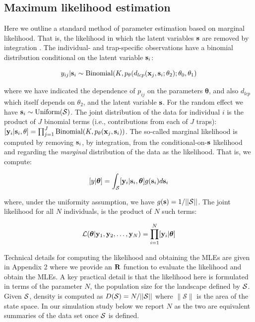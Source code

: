 \documentclass[12pt]{article}
\begin{document}
\begin{spacing}{1.8}
\section{Maximum likelihood estimation}
\label{sec.mle}

Here we outline a standard method of parameter estimation based on
marginal likelihood. That is, the likelihood in which the latent
variables ${\bf s}$ are removed by integration \citep{borchers_efford:2008}.
The individual- and trap-specific observations have a binomial
distribution conditional on the latent variable ${\bf s}_{i}$:

\begin{equation}
  y_{ij}| {\bf s}_{i} \sim \mbox{Binomial}(K, p_{\theta}(d_{lcp}({\bf x}_{j},{\bf s}_{i};\theta_{2}); \theta_{0}, \theta_{1})
\label{mle.eq.cond-on-s}
\end{equation}

{\flushleft where} we have indicated the dependence of $p_{ij}$ on the parameters
${\bm \theta}$, and also $d_{lcp}$ which
itself depends on $\theta_{2}$, and the latent variable ${\bf s}$.
For the random effect we have ${\bf s}_{i} \sim  \mbox{Uniform}({\cal
  S})$.
The joint distribution of the data for individual $i$ is the product
of $J$ binomial terms (i.e., contributions from each of $J$ traps):
$  [{\bf y}_{i} | {\bf s}_{i} , \theta] =
  \prod_{j=1}^{J} \mbox{Binomial}(K, p_{\theta}({\bf x}_{j},{\bf s}_{i}) )$.
 The so-called marginal likelihood is computed by removing
${\bf s}_{i}$, by integration,  from the conditional-on-${\bf s}$
likelihood and regarding the {\it marginal} distribution of the data
as the likelihood. That
is, we compute:

\[
  [y|{\bm \theta}] =
\int_{{\cal S}}  [ {\bf y}_{i} |{\bf s}_{i},{\bm \theta}] g({\bf s}_{i}) d{\bf s}_{i}
\]

{\flushleft where}, under the uniformity assumption, we have
$g({\bf s}) = 1/||{\cal S}||$.
The joint likelihood for all $N$ individuals,
is the product of $N$ such terms:

\[
{\cal L}({\bm \theta} | {\bf y}_{1},{\bf y}_{2},\ldots, {\bf y}_{N}) = \prod_{i=1}^{N}
[{\bf y}_{i}|{\bm \theta}]
\]

Technical details for computing the likelihood and obtaining the MLEs
are given in Appendix 2 where we provide an ${\bf R}$ function
to evaluate the likelihood and obtain the MLEs.
A key practical detail is that the likelihood here is formulated in
terms of the parameter $N$, the population size for the landscape
defined by ${\cal S}$. Given ${\cal S}$, density
is
computed as $D({\cal S}) = N/||{\cal S}||$ where $\|\mathcal{S}\|$ is
the area of the state space. In our simulation study
below we report $N$ as the two are equivalent summaries of the data
set once ${\cal S}$ is defined.



\end{spacing}
\end{document}
